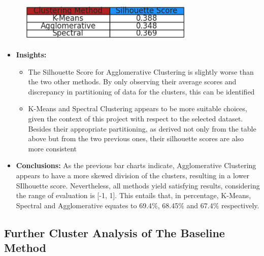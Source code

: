 \documentclass[11pt]{article}
\begin{document}
\begin{figure}[H]
\centering
\includegraphics[width=8.46cm,height=1.89cm]{./images/image2.png}
\end{figure}

\vspace{1\baselineskip}


\begin{itemize}
	\item \textbf{Insights:}

\begin{itemize}
	\item The Silhouette Score for Agglomerative Clustering is slightly worse than the two other methods. By only observing their average scores and discrepancy in partitioning of data for the clusters, this can be identified
        \item K-Means and Spectral Clustering appears to be more suitable choices, given the context of this project with respect to the selected dataset. Besides their appropriate partitioning, as derived not only from the table above but from the two previous ones, their silhouette scores are also more consistent

\end{itemize}
\end{itemize}

\vspace{1\baselineskip}
\begin{itemize}
	\item \textbf{Conclusions:} As the previous bar charts indicate, Agglomerative Clustering appears to have a more skewed division of the clusters, resulting in a lower SIlhouette score. Nevertheless, all methods yield satisfying results, considering the range of evaluation is [-1, 1]. This entails that, in percentage, K-Means, Spectral and Agglomerative equates to 69.4$\%$, 68.45$\%$ and 67.4$\%$ respectively.

\end{itemize}
\vspace{1\baselineskip}
\subsection{Further Cluster Analysis of The Baseline Method}
\end{document}
